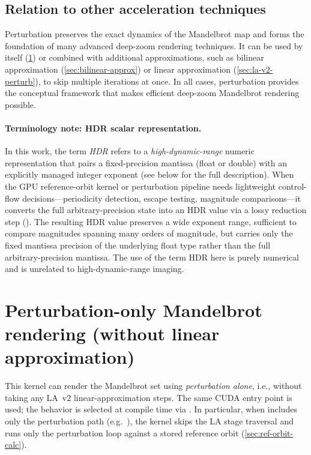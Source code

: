 \subsection{Relation to other acceleration techniques}

Perturbation preserves the exact dynamics of the Mandelbrot map and forms the
foundation of many advanced deep-zoom rendering techniques. It can be used by
itself (\cref{sec:perturb-only}) or combined with additional approximations, such as bilinear approximation
(\cref{sec:bilinear-approx}) or linear approximation (\cref{sec:la-v2-perturb}),
to skip multiple iterations at once. In all cases, perturbation provides
the conceptual framework that makes efficient deep-zoom Mandelbrot rendering
possible.

\paragraph{Terminology note: HDR scalar representation.}
In this work, the term \emph{HDR} refers to a \emph{high-dynamic-range} numeric
representation that pairs a fixed-precision mantissa (float or double) with an
explicitly managed integer exponent (see below for the full description).  When the GPU reference-orbit kernel or
perturbation pipeline needs lightweight control-flow decisions---periodicity
detection, escape testing, magnitude comparisons---it converts the full
arbitrary-precision state into an HDR value via a lossy reduction step
().  The resulting HDR value preserves a wide exponent range,
sufficient to compare magnitudes spanning many orders of magnitude, but carries
only the fixed mantissa precision of the underlying float type rather than the
full arbitrary-precision mantissa.  The use of the term HDR here is purely
numerical and is unrelated to high-dynamic-range imaging.

\section{Perturbation-only Mandelbrot rendering (without linear approximation)}
\label{sec:perturb-only}

This kernel can render the Mandelbrot set using \emph{perturbation alone}, i.e.,
without taking any LA~v2 linear-approximation steps. The same CUDA entry point
 is
used; the behavior is selected at compile time via . In
particular, when  includes only the perturbation path (e.g.\
), the kernel skips the LA stage traversal and runs only the
perturbation loop against a stored reference orbit (\cref{sec:ref-orbit-calc}).


